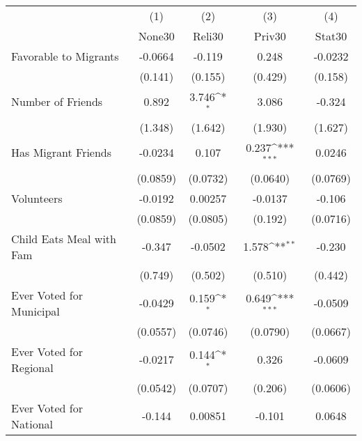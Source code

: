 {
\def\sym#1{\ifmmode^{#1}\else\(^{#1}\)\fi}
\begin{tabular}{l*{4}{c}}
\hline\hline
            &\multicolumn{1}{c}{(1)}&\multicolumn{1}{c}{(2)}&\multicolumn{1}{c}{(3)}&\multicolumn{1}{c}{(4)}\\
            &\multicolumn{1}{c}{None30}&\multicolumn{1}{c}{Reli30}&\multicolumn{1}{c}{Priv30}&\multicolumn{1}{c}{Stat30}\\
\hline
Favorable to Migrants&     -0.0664         &      -0.119         &       0.248         &     -0.0232         \\
            &     (0.141)         &     (0.155)         &     (0.429)         &     (0.158)         \\
[1em]
Number of Friends&       0.892         &       3.746\sym{*}  &       3.086         &      -0.324         \\
            &     (1.348)         &     (1.642)         &     (1.930)         &     (1.627)         \\
[1em]
Has Migrant Friends&     -0.0234         &       0.107         &       0.237\sym{***}&      0.0246         \\
            &    (0.0859)         &    (0.0732)         &    (0.0640)         &    (0.0769)         \\
[1em]
Volunteers  &     -0.0192         &     0.00257         &     -0.0137         &      -0.106         \\
            &    (0.0859)         &    (0.0805)         &     (0.192)         &    (0.0716)         \\
[1em]
Child Eats Meal with Fam&      -0.347         &     -0.0502         &       1.578\sym{**} &      -0.230         \\
            &     (0.749)         &     (0.502)         &     (0.510)         &     (0.442)         \\
[1em]
Ever Voted for Municipal&     -0.0429         &       0.159\sym{*}  &       0.649\sym{***}&     -0.0509         \\
            &    (0.0557)         &    (0.0746)         &    (0.0790)         &    (0.0667)         \\
[1em]
Ever Voted for Regional&     -0.0217         &       0.144\sym{*}  &       0.326         &     -0.0609         \\
            &    (0.0542)         &    (0.0707)         &     (0.206)         &    (0.0606)         \\
[1em]
Ever Voted for National&      -0.144         &     0.00851         &      -0.101         &      0.0648         \\

\end{tabular}}
